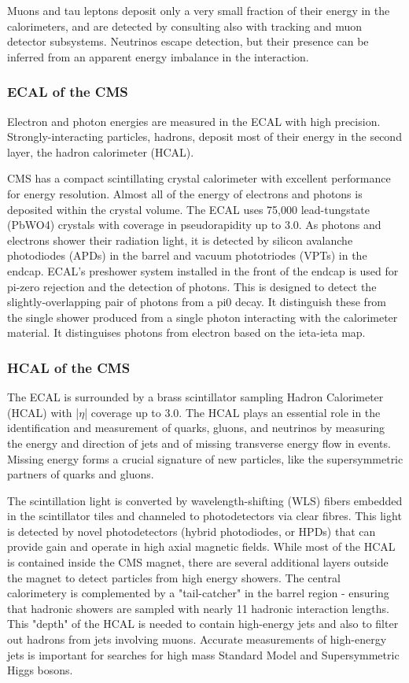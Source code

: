 Muons and tau leptons deposit only a very small fraction of their energy in the calorimeters, and are detected by consulting also with tracking and muon detector subsystems. 
Neutrinos escape detection, but their presence can be inferred from an apparent energy imbalance in the interaction.
\subsubsection{ECAL of the CMS}
Electron and photon energies are measured in the ECAL with high precision. 
Strongly-interacting particles, hadrons, deposit most of their energy in the second layer, the hadron calorimeter (HCAL). 

CMS has a compact scintillating crystal calorimeter with excellent performance for energy resolution.
Almost all of the energy of electrons and photons is deposited within the crystal volume. The ECAL uses 75,000 lead-tungstate (PbWO4) crystals with coverage in pseudorapidity up to 3.0. As photons and electrons shower their radiation light, it is detected by silicon avalanche photodiodes (APDs) in the barrel and vacuum phototriodes (VPTs) in the endcap.
ECAL's preshower system installed in the front of the endcap is used for pi-zero rejection and the detection of photons. 
This is designed to detect the slightly-overlapping pair of photons from a pi0 decay.
It distinguish these from the single shower produced from a single photon interacting with the calorimeter material.
It distinguises photons from electron based on the ieta-ieta map.

\subsubsection{HCAL of the CMS}
The ECAL is surrounded by a brass scintillator sampling Hadron Calorimeter (HCAL) with |$\eta$| coverage up to 3.0.
The HCAL plays an essential role in the identification and measurement of quarks, gluons, and neutrinos by measuring the energy and direction of jets and of missing transverse energy flow in events. 
Missing energy forms a crucial signature of new particles, like the supersymmetric partners of quarks and gluons.

The scintillation light is converted by wavelength-shifting (WLS) fibers embedded in the scintillator tiles and channeled to photodetectors via clear fibres. 
This light is detected by novel photodetectors (hybrid photodiodes, or HPDs) that can provide gain and operate in high axial magnetic fields.
While most of the HCAL is contained inside the CMS magnet, there are several additional layers outside the magnet to detect particles from high energy showers.
The central calorimetery is complemented by a "tail-catcher" in the barrel region - ensuring that hadronic showers are sampled with nearly 11 hadronic interaction lengths. 
This "depth" of the HCAL is needed to contain high-energy jets and also to filter out hadrons from jets involving muons. 
Accurate measurements of high-energy jets is important for searches for high mass Standard Model and Supersymmetric Higgs bosons.

